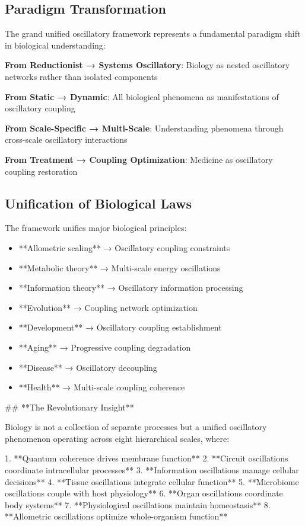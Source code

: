 \documentclass[twocolumn]{article}
\begin{document}
\subsection{Paradigm Transformation}

The grand unified oscillatory framework represents a fundamental paradigm shift in biological understanding:

\textbf{From Reductionist → Systems Oscillatory}: Biology as nested oscillatory networks rather than isolated components

\textbf{From Static → Dynamic}: All biological phenomena as manifestations of oscillatory coupling

\textbf{From Scale-Specific → Multi-Scale}: Understanding phenomena through cross-scale oscillatory interactions

\textbf{From Treatment → Coupling Optimization}: Medicine as oscillatory coupling restoration

\subsection{Unification of Biological Laws}

The framework unifies major biological principles:

\begin{itemize}
\item **Allometric scaling** → Oscillatory coupling constraints
\item **Metabolic theory** → Multi-scale energy oscillations  
\item **Information theory** → Oscillatory information processing
\item **Evolution** → Coupling network optimization
\item **Development** → Oscillatory coupling establishment
\item **Aging** → Progressive coupling degradation
\item **Disease** → Oscillatory decoupling
\item **Health** → Multi-scale coupling coherence
\end{itemize}

## **The Revolutionary Insight**

Biology is not a collection of separate processes but a unified oscillatory phenomenon operating across eight hierarchical scales, where:

1. **Quantum coherence drives membrane function**
2. **Circuit oscillations coordinate intracellular processes**  
3. **Information oscillations manage cellular decisions**
4. **Tissue oscillations integrate cellular function**
5. **Microbiome oscillations couple with host physiology**
6. **Organ oscillations coordinate body systems**
7. **Physiological oscillations maintain homeostasis**
8. **Allometric oscillations optimize whole-organism function**
\end{document}
